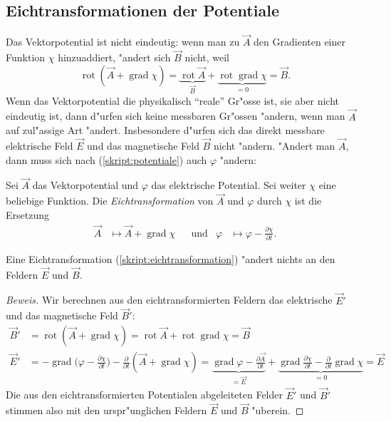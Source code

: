 \subsection{Eichtransformationen der Potentiale}
Das Vektorpotential ist nicht eindeutig: wenn man zu $\vec A$
den Gradienten einer Funktion $\chi$ hinzuaddiert, "andert sich
$\vec B$ nicht, weil
\[
\operatorname{rot}(\vec A+\operatorname{grad}\chi)
=
\underbrace{\operatorname{rot}\vec A}_{\vec B}
+
\underbrace{\operatorname{rot}\operatorname{grad}\chi}_{=0}
=
\vec B.
\]
Wenn das Vektorpotential die physikalisch ``reale'' Gr"osse ist,
sie aber nicht eindeutig ist, dann d"urfen sich keine messbaren
Gr"ossen "andern, wenn man $\vec A$ auf zul"assige Art "andert.
Insbesondere d"urfen sich das direkt messbare elektrische Feld
$\vec E$ und das magnetische Feld $\vec B$ nicht "andern.
"Andert man $\vec A$, dann muss sich nach (\ref{skript:potentiale})
auch $\varphi$ "andern:

\begin{definition}
Sei $\vec A$ das Vektorpotential und $\varphi$ das elektrische
Potential. Sei weiter $\chi$ eine beliebige Funktion.
Die {\em Eichtransformation} von $\vec A$ und $\varphi$ durch $\chi$ ist
die Ersetzung
\begin{equation}
\begin{aligned}
\vec A&\mapsto \vec A + \operatorname{grad}\chi
&&\text{und}&
\varphi&\mapsto \varphi-\frac{\partial\chi}{\partial t}.
\end{aligned}
\label{skript:eichtransformation}
\end{equation}
\end{definition}

\begin{satz}
Eine Eichtransformation (\ref{skript:eichtransformation}) "andert nichts an den
Feldern $\vec E$ und $\vec B$.
\end{satz}

\begin{proof}[Beweis]
Wir berechnen aus den eichtransformierten Feldern das elektrische 
 $\vec E'$ und das magnetische Feld $\vec B'$:
\begin{align*}
\vec B'
&=
\operatorname{rot}(\vec A+\operatorname{grad}\chi)
=
\operatorname{rot}\vec A+\operatorname{rot}\operatorname{grad}\chi
=
\vec B
\\
\vec E'
&=
-\operatorname{grad}\biggl(\varphi -\frac{\partial\chi}{\partial t}\biggr)
-\frac{\partial}{\partial t}(\vec A+\operatorname{grad}\chi)
=
\underbrace{
\operatorname{grad}\varphi-\frac{\partial\vec A}{\partial t}
}_{=\vec E}
+
\underbrace{
\operatorname{grad}\frac{\partial\chi}{\partial t}
-\frac{\partial}{\partial t}\operatorname{grad}\chi
}_{=0}
=
\vec E
\end{align*}
Die aus den eichtransformierten Potentialen abgeleiteten Felder $\vec E'$
und $\vec B'$ stimmen also mit den urspr"unglichen Feldern $\vec E$
und $\vec B$ "uberein.
\end{proof}

